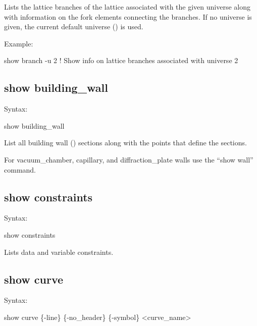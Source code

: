 {{{{{Lists the lattice branches of the lattice associated with the given universe along with
information on the fork elements connecting the branches.  If no universe is given, the
current default universe () is used.

Example:
\begin{example}
  show branch -u 2     ! Show info on lattice branches associated with universe 2
\end{example}


\subsection{show building_wall}
\label{s:show.building}

Syntax:
\begin{example}
  show building_wall
\end{example}
 

List all building wall () sections along with the points that define
the sections.

For vacuum_chamber, capillary, and diffraction_plate walls use the ``show wall'' command.


\subsection{show constraints}
\label{s:show.constraints}

Syntax:
\begin{example}
  show constraints
\end{example}


Lists data and variable constraints.


\subsection{show curve}
\label{s:show.curve}

Syntax:
\begin{example}
  show curve \{-line\} \{-no_header\} \{-symbol\} <curve_name>
\end{example}


}}}}}

